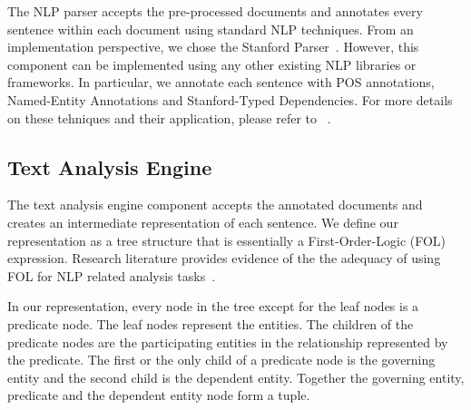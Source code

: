 The NLP parser accepts the pre-processed documents and annotates every sentence within each document using standard NLP techniques. From an implementation perspective, we chose the Stanford Parser~\cite{SNLP}. However, this component can be implemented using any other existing NLP libraries or frameworks. In particular, we annotate each sentence with POS annotations, Named-Entity Annotations and Stanford-Typed Dependencies. For more details on these tehniques and their application, please refer to ~\cite{Marneffe06LREC,Marneffe08COLING,pandita12:inferring, pandita13:WHYPER}.

%




\subsection{Text Analysis Engine}
\label{sub:TAE}
%

The text analysis engine component accepts the annotated documents and creates an intermediate representation of each sentence. We define our representation as a tree structure that is essentially a First-Order-Logic (FOL) expression. Research literature provides evidence of the the adequacy of using FOL for NLP related analysis tasks~\cite{Sinha2009,Sinha2010,pandita12:inferring, pandita13:WHYPER}.

In our representation, every node in the tree except for the leaf nodes is a predicate node. The leaf nodes represent the entities. The children of the predicate nodes are the participating entities in the relationship represented by the predicate. The first or the only child of a predicate node is the governing entity and the second child is the dependent entity. Together the governing entity, predicate and the dependent entity node form a tuple.  


